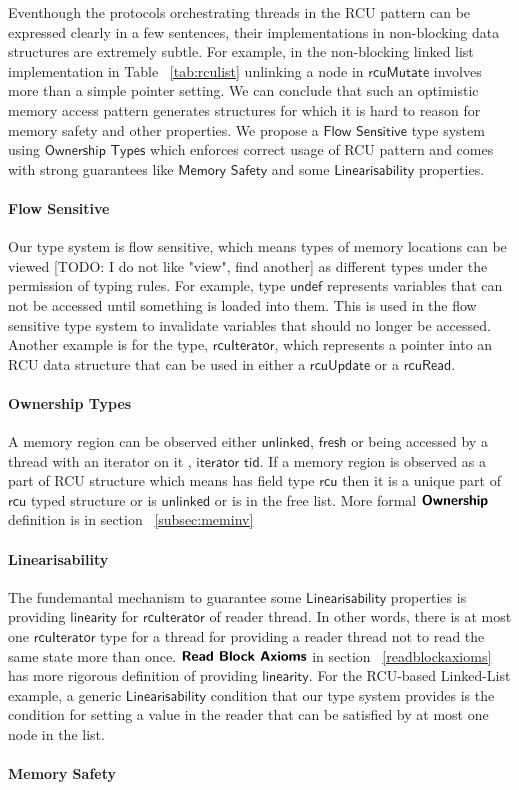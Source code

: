 Eventhough the protocols orchestrating threads in the RCU pattern can be expressed clearly in a few sentences, their implementations in non-blocking data structures are extremely subtle.  For example, in the non-blocking linked list implementation in Table ~\ref{tab:rculist}  unlinking a node in $\textsf{rcuMutate}$ involves more than a simple pointer setting. We can conclude that such an optimistic memory access pattern generates structures for which it is hard to reason for memory safety and other properties. We propose a $\textsf{Flow Sensitive}$ type system using $\textsf{Ownership Types}$ which enforces correct usage of RCU pattern  and comes with strong guarantees like $\textsf{Memory Safety}$ and some $\textsf{Linearisability}$ properties. 

\paragraph{Flow Sensitive} Our type system is flow sensitive, which means types of memory locations can be viewed [TODO: I do not like "view", find another] as different types under the permission of typing rules. For example, type $\textsf{undef}$ represents variables that can not be accessed until something is loaded into them. This is used in the flow sensitive type system to invalidate variables that should no longer be accessed. Another example is for the type, $\textsf{rcuIterator}$, which represents a pointer into an RCU data structure that can be used in either a $\textsf{rcuUpdate}$ or a $\textsf{rcuRead}$.
\paragraph{Ownership Types} A memory region can be observed either $\textsf{unlinked}$, $\textsf{fresh}$ or being accessed by a thread with an iterator on it , $\textsf{iterator tid}$.  If a memory region is observed as a part of RCU structure which means has field type $\textsf{rcu}$ then it is a unique part of $\textsf{rcu}$ typed structure or is $\textsf{unlinked}$  or is in the free list. More formal $\textbf{\textsf{Ownership}}$ definition is in section ~\ref{subsec:meminv} 
\paragraph{Linearisability} The fundemantal mechanism to guarantee some $\textsf{Linearisability}$ properties is providing $\textsf{linearity}$ for $\textsf{rcuIterator}$ of reader thread.  In other words, there is at most one $\textsf{rcuIterator}$ type for a thread for providing a reader thread not to read the same state more than once.  $\textbf{\textsf{Read Block Axioms}}$ in section ~\ref{readblockaxioms} has more rigorous definition of providing $\textsf{linearity}$. For the RCU-based Linked-List example, a generic $\textsf{Linearisability}$ condition that our type system provides is the condition for setting a value in the reader that can be satisfied by at most one node in the list.
\paragraph{Memory Safety} 



